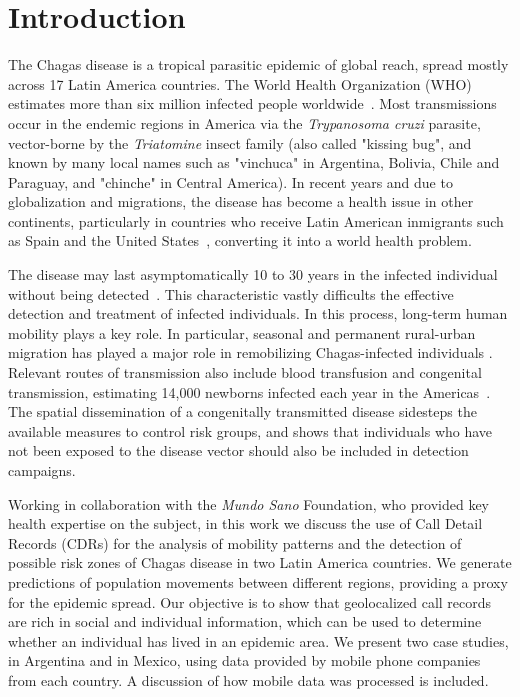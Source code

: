 \section{Introduction}

The Chagas disease is a tropical parasitic epidemic of global reach, spread mostly across 17 Latin America countries. The World Health Organization (WHO) estimates more than six million infected people worldwide~\cite{who2016}. Most transmissions occur in the endemic regions in America via the \textit{Trypanosoma cruzi} parasite, vector-borne by the \textit{Triatomine} insect family (also called "kissing bug", and known by many local names such as "vinchuca" in Argentina, Bolivia, Chile and Paraguay, and "chinche" in Central America). In recent years and due to globalization and migrations, the disease has become a health issue in other continents, particularly in countries who receive Latin American inmigrants such as Spain and the United States~\cite{schmunis2010chagas}, converting it into a world health problem.

The disease may last asymptomatically 10 to 30 years in the infected individual without being detected~\cite{rassi2012american}. This characteristic vastly difficults the effective detection and treatment of infected individuals. In this process, long-term human mobility plays a key role. In particular, seasonal and permanent rural-urban migration has played a major role in remobilizing Chagas-infected individuals \cite{briceno2009chagas}. 
Relevant routes of transmission also include blood transfusion and congenital transmission, estimating 14,000 newborns infected each year in the Americas~\cite{OPS2006chagas}.
The spatial dissemination of a congenitally transmitted disease sidesteps the available measures to control risk groups, and shows that individuals who have not been exposed to the disease vector should also be included in detection campaigns.

Working in collaboration with the \textit{Mundo Sano} Foundation, who provided key health expertise on the subject, in this work we discuss the use of Call Detail Records (CDRs) for the analysis of mobility patterns and the detection of possible risk zones of Chagas disease in two Latin America countries. We generate predictions of population movements between different regions, providing a proxy for the epidemic spread. Our objective is to show that geolocalized call records are rich in social and individual information, which can be used to determine whether an individual has lived in an epidemic area. We present two case studies, in Argentina and in Mexico, using data provided by mobile phone companies from each country. A discussion of how mobile data was processed is included. 

